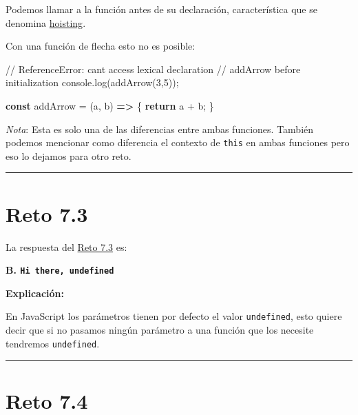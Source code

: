 \documentclass[
  letterpaper,
  DIV=11,
  numbers=noendperiod]{scrreprt}
\newenvironment{Shaded}{\begin{snugshade}}{\end{snugshade}}
\newcommand{\BuiltInTok}[1]{\textcolor[rgb]{0.00,0.23,0.31}{#1}}
\newcommand{\CommentTok}[1]{\textcolor[rgb]{0.37,0.37,0.37}{#1}}
\newcommand{\ControlFlowTok}[1]{\textcolor[rgb]{0.00,0.23,0.31}{\textbf{#1}}}
\newcommand{\DecValTok}[1]{\textcolor[rgb]{0.68,0.00,0.00}{#1}}
\newcommand{\FunctionTok}[1]{\textcolor[rgb]{0.28,0.35,0.67}{#1}}
\newcommand{\KeywordTok}[1]{\textcolor[rgb]{0.00,0.23,0.31}{\textbf{#1}}}
\newcommand{\NormalTok}[1]{\textcolor[rgb]{0.00,0.23,0.31}{#1}}
\newcommand{\OperatorTok}[1]{\textcolor[rgb]{0.37,0.37,0.37}{#1}}
\begin{document}
Podemos llamar a la función antes de su declaración, característica que
se denomina \hyperref[glos-hoisting]{hoisting}.

Con una función de flecha esto no es posible:

\begin{Shaded}
\begin{Highlighting}[]
\CommentTok{// ReferenceError: can\textquotesingle{}t access lexical declaration }
\CommentTok{// \textquotesingle{}addArrow\textquotesingle{} before initialization }
\BuiltInTok{console}\OperatorTok{.}\FunctionTok{log}\NormalTok{(}\FunctionTok{addArrow}\NormalTok{(}\DecValTok{3}\OperatorTok{,}\DecValTok{5}\NormalTok{))}\OperatorTok{;} 

\KeywordTok{const}\NormalTok{ addArrow }\OperatorTok{=}\NormalTok{ (a}\OperatorTok{,}\NormalTok{ b) }\KeywordTok{=\textgreater{}}\NormalTok{ \{}
  \ControlFlowTok{return}\NormalTok{ a }\OperatorTok{+}\NormalTok{ b}\OperatorTok{;}
\NormalTok{\}}
\end{Highlighting}
\end{Shaded}

\emph{Nota}: Esta es solo una de las diferencias entre ambas funciones.
También podemos mencionar como diferencia el contexto de \texttt{this}
en ambas funciones pero eso lo dejamos para otro reto.

\begin{center}\rule{0.5\linewidth}{0.5pt}\end{center}

\section{Reto 7.3}\label{sec-sol-cap7-reto3}

La respuesta del \hyperref[sec-cap7-reto3]{Reto 7.3} es:

\textbf{B. \texttt{Hi\ there,\ undefined}}

\textbf{Explicación:}

En JavaScript los parámetros tienen por defecto el valor
\texttt{undefined}, esto quiere decir que si no pasamos ningún parámetro
a una función que los necesite tendremos \texttt{undefined}.

\begin{center}\rule{0.5\linewidth}{0.5pt}\end{center}

\section{Reto 7.4}\label{sec-sol-cap7-reto4}
\end{document}
